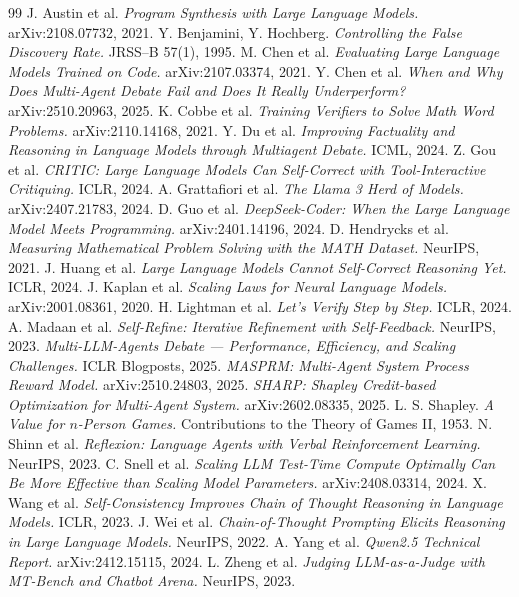 \documentclass[11pt,a4paper]{article}
\begin{document}
\begin{thebibliography}{99}\small
{} J. Austin et al. \emph{Program Synthesis with Large Language Models.}
arXiv:2108.07732, 2021.
 Y. Benjamini, Y. Hochberg. \emph{Controlling the False Discovery Rate.}
JRSS--B 57(1), 1995.
 M. Chen et al. \emph{Evaluating Large Language Models Trained on Code.}
arXiv:2107.03374, 2021.
 Y. Chen et al. \emph{When and Why Does Multi-Agent Debate Fail and Does It
Really Underperform?} arXiv:2510.20963, 2025.
 K. Cobbe et al. \emph{Training Verifiers to Solve Math Word Problems.}
arXiv:2110.14168, 2021.
 Y. Du et al. \emph{Improving Factuality and Reasoning in Language Models
through Multiagent Debate.} ICML, 2024.
 Z. Gou et al. \emph{CRITIC: Large Language Models Can Self-Correct with
Tool-Interactive Critiquing.} ICLR, 2024.
 A. Grattafiori et al. \emph{The Llama 3 Herd of Models.}
arXiv:2407.21783, 2024.
 D. Guo et al. \emph{DeepSeek-Coder: When the Large Language Model Meets
Programming.} arXiv:2401.14196, 2024.
 D. Hendrycks et al. \emph{Measuring Mathematical Problem Solving with
the MATH Dataset.} NeurIPS, 2021.
 J. Huang et al. \emph{Large Language Models Cannot Self-Correct Reasoning
Yet.} ICLR, 2024.
 J. Kaplan et al. \emph{Scaling Laws for Neural Language Models.}
arXiv:2001.08361, 2020.
 H. Lightman et al. \emph{Let's Verify Step by Step.} ICLR, 2024.
 A. Madaan et al. \emph{Self-Refine: Iterative Refinement with
Self-Feedback.} NeurIPS, 2023.
 \emph{Multi-LLM-Agents Debate --- Performance, Efficiency, and Scaling
Challenges.} ICLR Blogposts, 2025.
 \emph{MASPRM: Multi-Agent System Process Reward Model.} arXiv:2510.24803,
2025.
 \emph{SHARP: Shapley Credit-based Optimization for Multi-Agent System.}
arXiv:2602.08335, 2025.
 L. S. Shapley. \emph{A Value for $n$-Person Games.} Contributions to the
Theory of Games II, 1953.
 N. Shinn et al. \emph{Reflexion: Language Agents with Verbal Reinforcement
Learning.} NeurIPS, 2023.
 C. Snell et al. \emph{Scaling LLM Test-Time Compute Optimally Can Be More
Effective than Scaling Model Parameters.} arXiv:2408.03314, 2024.
 X. Wang et al. \emph{Self-Consistency Improves Chain of Thought Reasoning in
Language Models.} ICLR, 2023.
 J. Wei et al. \emph{Chain-of-Thought Prompting Elicits Reasoning in Large
Language Models.} NeurIPS, 2022.
 A. Yang et al. \emph{Qwen2.5 Technical Report.} arXiv:2412.15115, 2024.
 L. Zheng et al. \emph{Judging LLM-as-a-Judge with MT-Bench and Chatbot
Arena.} NeurIPS, 2023.
\end{thebibliography}
\end{document}
